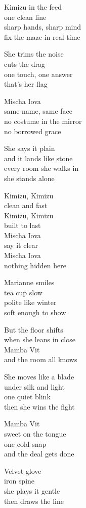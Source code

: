 \begin{lyrics}

Kimizu in the feed\\
one clean line\\
sharp hands, sharp mind\\
fix the maze in real time

She trims the noise\\
cuts the drag\\
one touch, one answer\\
that’s her flag

Mischa Iova\\
same name, same face\\
no costume in the mirror\\
no borrowed grace

She says it plain\\
and it lands like stone\\
every room she walks in\\
she stands alone

Kimizu, Kimizu\\
clean and fast\\
Kimizu, Kimizu\\
built to last\\
Mischa Iova\\
say it clear\\
Mischa Iova\\
nothing hidden here

Marianne smiles\\
tea cup slow\\
polite like winter\\
soft enough to show

But the floor shifts\\
when she leans in close\\
Mamba Vit\\
and the room all knows

She moves like a blade\\
under silk and light\\
one quiet blink\\
then she wins the fight

Mamba Vit\\
sweet on the tongue\\
one cold snap\\
and the deal gets done

Velvet glove\\
iron spine\\
she plays it gentle\\
then draws the line


\end{lyrics}
